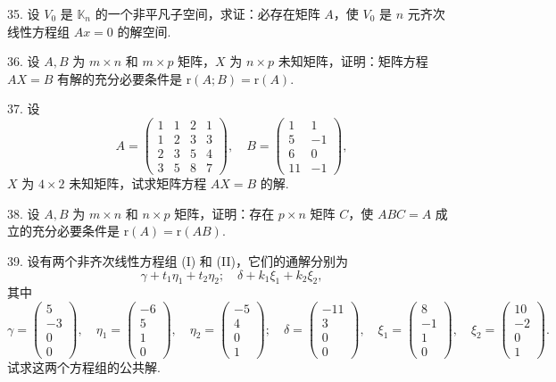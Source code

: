 \documentclass[UTF8, 12pt, fontset=fandol, oneside]{ctexart}
\begin{document}
35. 设 $V_0$ 是 $\mathbb{K}_n$ 的一个非平凡子空间，求证：必存在矩阵 $A$，使 $V_0$ 是 $n$ 元齐次线性方程组 $Ax=0$ 的解空间.

36. 设 $A,B$ 为 $m\times n$ 和 $m\times p$ 矩阵，$X$ 为 $n\times p$ 未知矩阵，证明：矩阵方程 $AX=B$ 有解的充分必要条件是 $\mathrm{r}(A;B)=\mathrm{r}(A)$.

37. 设
\[
A=\left(\begin{array}{rrrr}
1&1&2&1\\
1&2&3&3\\
2&3&5&4\\
3&5&8&7
\end{array}\right),\quad
B=\left(\begin{array}{rr}
1&1\\
5&-1\\
6&0\\
11&-1
\end{array}\right),
\]
$X$ 为 $4\times 2$ 未知矩阵，试求矩阵方程 $AX=B$ 的解.

38. 设 $A,B$ 为 $m\times n$ 和 $n\times p$ 矩阵，证明：存在 $p\times n$ 矩阵 $C$，使 $ABC=A$ 成立的充分必要条件是 $\mathrm{r}(A)=\mathrm{r}(AB)$.

39. 设有两个非齐次线性方程组 (I) 和 (II)，它们的通解分别为
\[
\gamma+t_1\eta_1+t_2\eta_2;\quad \delta+k_1\xi_1+k_2\xi_2,
\]
其中
\[
\gamma=\left(\begin{array}{r}
5\\
-3\\
0\\
0
\end{array}\right),\quad
\eta_1=\left(\begin{array}{r}
-6\\
5\\
1\\
0
\end{array}\right),\quad
\eta_2=\left(\begin{array}{r}
-5\\
4\\
0\\
1
\end{array}\right);
\quad
\delta=\left(\begin{array}{r}
-11\\
3\\
0\\
0
\end{array}\right),\quad
\xi_1=\left(\begin{array}{r}
8\\
-1\\
1\\
0
\end{array}\right),\quad
\xi_2=\left(\begin{array}{r}
10\\
-2\\
0\\
1
\end{array}\right).
\]
试求这两个方程组的公共解.
\end{document}
